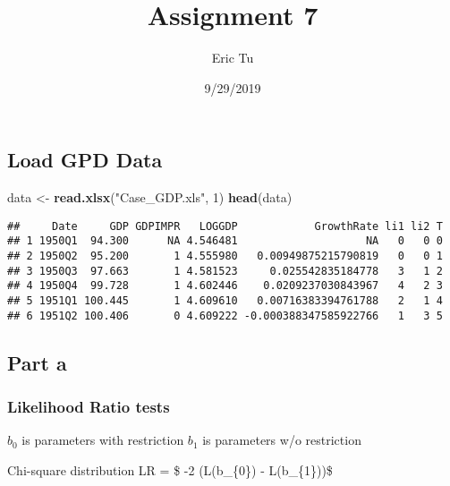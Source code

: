 \documentclass[]{article}
\title{Assignment 7}
\author{Eric Tu}
\date{9/29/2019}
\newenvironment{Shaded}{\begin{snugshade}}{\end{snugshade}}
\newcommand{\DecValTok}[1]{\textcolor[rgb]{0.00,0.00,0.81}{#1}}
\newcommand{\KeywordTok}[1]{\textcolor[rgb]{0.13,0.29,0.53}{\textbf{#1}}}
\newcommand{\NormalTok}[1]{#1}
\newcommand{\StringTok}[1]{\textcolor[rgb]{0.31,0.60,0.02}{#1}}
\begin{document}
\maketitle

\hypertarget{load-gpd-data}{%
\subsection{Load GPD Data}\label{load-gpd-data}}

\begin{Shaded}
\begin{Highlighting}[]
\NormalTok{data <-}\StringTok{ }\KeywordTok{read.xlsx}\NormalTok{(}\StringTok{"Case_GDP.xls"}\NormalTok{, }\DecValTok{1}\NormalTok{)}
\KeywordTok{head}\NormalTok{(data)}
\end{Highlighting}
\end{Shaded}

\begin{verbatim}
##     Date     GDP GDPIMPR   LOGGDP            GrowthRate li1 li2 T
## 1 1950Q1  94.300      NA 4.546481                    NA   0   0 0
## 2 1950Q2  95.200       1 4.555980   0.00949875215790819   0   0 1
## 3 1950Q3  97.663       1 4.581523     0.025542835184778   3   1 2
## 4 1950Q4  99.728       1 4.602446    0.0209237030843967   4   2 3
## 5 1951Q1 100.445       1 4.609610   0.00716383394761788   2   1 4
## 6 1951Q2 100.406       0 4.609222 -0.000388347585922766   1   3 5
\end{verbatim}

\hypertarget{part-a}{%
\subsection{Part a}\label{part-a}}

\hypertarget{likelihood-ratio-tests}{%
\subsubsection{Likelihood Ratio tests}\label{likelihood-ratio-tests}}

\(b_{0}\) is parameters with restriction \(b_{1}\) is parameters w/o
restriction

Chi-square distribution LR = \$ -2 (\log L(b\_\{0\}) -
\log L(b\_\{1\}))\$
\end{document}
